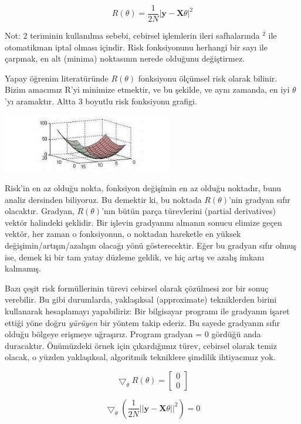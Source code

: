 \documentclass[12pt,fleqn]{article}\usepackage{../../common}
\begin{document}
$$
  R(\theta) = \frac{1}{2N}|\mathbf{y} - \mathbf{X}\theta|^2
$$

Not: $2$ teriminin kullanılma sebebi, cebirsel işlemlerin ileri safhalarında
$^2$ ile otomatikman iptal olması içindir. Risk fonksiyonunu herhangi bir sayı
ile çarpmak, en alt (minima) noktasının nerede olduğunu değiştirmez. 

Yapay öğrenim literatüründe $R(\theta)$ fonksiyonu ölçümsel risk olarak bilinir. 
Bizim amacımız R'yi minimize etmektir, ve bu şekilde, ve aynı zamanda, en iyi
$\theta$'yı aramaktır. Altta 3 boyutlu risk fonksiyonu grafigi.

\includegraphics[width=20em]{risk.jpg}

Risk'in en az olduğu nokta, fonksiyon değişimin en az olduğu noktadır, bunu
analiz dersinden biliyoruz. Bu demektir ki, bu noktada $R(\theta)$'nin gradyan
sıfır olacaktır. Gradyan, $R(\theta)$'nın bütün parça türevlerini (partial
derivatives) vektör halindeki şeklidir. Bir işlevin gradyanını almanın sonucu
elimize geçen vektör, her zaman o fonksiyonun, o noktadan hareketle en yüksek
değişimin/artışın/azalışın olacağı yönü gösterecektir. Eğer bu gradyan sıfır
olmuş ise, demek ki bir tam yatay düzleme geldik, ve hiç artış ve azalış imkanı
kalmamış. 

Bazı çeşit risk formüllerinin türevi cebirsel olarak çözülmesi zor bir sonuç
verebilir. Bu gibi durumlarda, yaklaşıksal (approximate) tekniklerden birini
kullanarak hesaplamayı yapabiliriz: Bir bilgisayar programı ile gradyanın işaret
ettiği yöne doğru {\em yürüyen} bir yöntem takip ederiz. Bu sayede gradyanın
sıfır olduğu bölgeye erişmeye uğraşırız. Program gradyan = 0 gördüğü anda
duracaktır. Önümüzdeki örnek için çıkardığımız türev, cebirsel olarak temiz
olacak, o yüzden yaklaşıksal, algoritmik tekniklere şimdilik ihtiyacımız yok.

$$ 
  \bigtriangledown_{\theta} R\left(\theta\right) = \left[ \begin{array}{c}
      0 \\
      0 
    \end{array} \right]
 $$

$$ 
  \bigtriangledown_{\theta}\left( \frac{1}{2N}||\mathbf{y} -
  \mathbf{X}\theta||^2\right) = 0 
 $$
\end{document}
